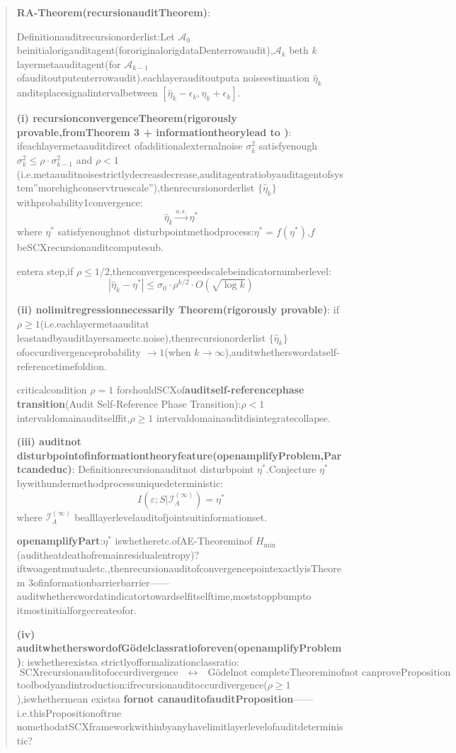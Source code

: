 \documentclass[
  12pt,
]{article}
\begin{document}
\begin{quote}
\textbf{RA-Theorem(recursionauditTheorem)}:

Definitionauditrecursionorderlist:Let \(\mathcal{A}_0\)
beinitialorigauditagent(fororiginalorigdataDenterrowaudit),\(\mathcal{A}_k\) beth \(k\)
layermetaauditagent(for \(\mathcal{A}_{k-1}\)
ofauditoutputenterrowaudit).eachlayerauditoutputa  noiseestimation \(\hat{\eta}_k\)
anditsplacesignalintervalbetween
\([\hat{\eta}_k - \epsilon_k, \hat{\eta}_k + \epsilon_k]\).

\textbf{(i) recursionconvergenceTheorem(rigorously provable,fromTheorem 3 + informationtheorylead to )}:
ifeachlayermetaauditdirect ofadditionalexternalnoise \(\sigma_k^2\) satisfyenough
\(\sigma_k^2 \leq \rho \cdot \sigma_{k-1}^2\) and
\(\rho < 1\)(i.e.metaauditnoisestrictlydecreasdecrease,auditagentratiobyauditagentofsystem''morehighconservtruescale''),thenrecursionorderlist
\(\{\hat{\eta}_k\}\) withprobability1convergence:
\[\hat{\eta}_k \xrightarrow{a.s.} \eta^*\] where \(\eta^*\)
satisfyenoughnot disturbpointmethodprocess:\(\eta^* = f(\eta^*)\),\(f\) beSCXrecursionauditcomputesub.

entera step,if \(\rho \leq 1/2\),thenconvergencespeedscalebeindicatornumberlevel:
\[|\hat{\eta}_k - \eta^*| \leq \sigma_0 \cdot \rho^{k/2} \cdot O(\sqrt{\log k})\]

\textbf{(ii) nolimitregressionnecessarily Theorem(rigorously provable)}: if
\(\rho \geq 1\)(i.e.eachlayermetaauditat leastandbyauditlayersameetc.noise),thenrecursionorderlist
\(\{\hat{\eta}_k\}\) ofoccurdivergenceprobability \(\to 1\)(when
\(k \to \infty\)),auditwhetherswordatself-referencetimefoldion.

criticalcondition \(\rho = 1\) forshouldSCXof\textbf{auditself-referencephase transition}(Audit
Self-Reference Phase Transition):\(\rho < 1\)
intervaldomainauditselffit,\(\rho \geq 1\) intervaldomainauditdisintegratecollapse.

\textbf{(iii) auditnot disturbpointofinformationtheoryfeature(openamplifyProblem,Partcandeduc)}:
Definitionrecursionauditnot disturbpoint \(\eta^*\).Conjecture \(\eta^*\) bywithundermethodprocessuniquedeterministic:
\[I(\varepsilon; S | \mathcal{I}_A^{(\infty)}) = \eta^*\] where
\(\mathcal{I}_A^{(\infty)}\) bealllayerlevelauditofjointsuitinformationset.

\textbf{openamplifyPart}:\(\eta^*\) iswhetheretc.ofAE-Theoreminof
\(H_{\min}\)(auditheatdeathofremainresidualentropy)?iftwoagentmutualetc.,thenrecursionauditofconvergencepointexactlyisTheorem
3ofinformationbarrierbarrier------auditwhetherswordatindicatortowardselfitselftime,moststoppbumpto  itmostinitialforgecreateofor.

\textbf{(iv) auditwhetherswordofGödelclassratioforeven(openamplifyProblem)}:
iswhetherexistsa  strictlyofformalizationclassratio:
\[\text{SCXrecursionauditofoccurdivergence} \quad \longleftrightarrow \quad \text{Gödelnot completeTheoreminofnot canproveProposition}\]
toolbodyandintroduction:ifrecursionauditoccurdivergence(\(\rho \geq 1\)),iswhethermean  existsa  \textbf{fornot canauditofauditProposition}------i.e.thisPropositionoftrue  nomethodatSCXframeworkwithinbyanyhavelimitlayerlevelofauditdeterministic?
\end{quote}
\end{document}

